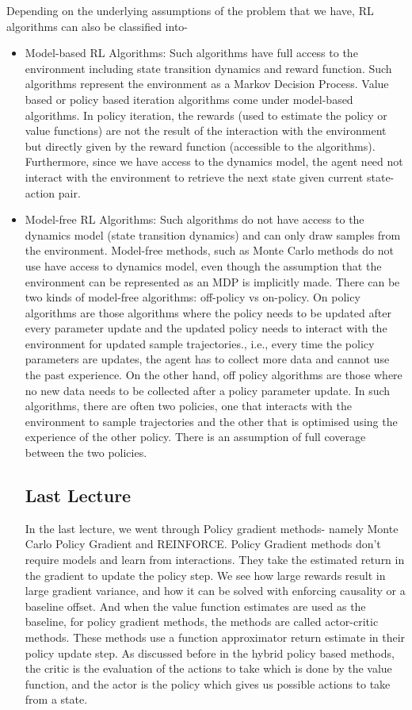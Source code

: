 \documentclass[11pt]{article}
\begin{document}
Depending on the underlying assumptions of the problem that we have, RL algorithms can also be classified into- 
\begin{itemize}
    \item Model-based RL Algorithms: Such algorithms have full access to the environment including state transition dynamics and reward function.  Such algorithms represent the environment as a Markov Decision Process. Value based or policy based iteration algorithms come under model-based algorithms. In policy iteration, the rewards (used to estimate the policy or value functions) are not the result of the interaction with the environment but directly given by the reward function (accessible to the algorithms). Furthermore, since we have access to the dynamics model, the agent need not interact with the environment to retrieve the next state given current state-action pair.
    
    \item Model-free RL Algorithms: Such algorithms do not have access to the dynamics model (state transition dynamics) and can only draw samples from the environment. Model-free methods, such as Monte Carlo methods do not use have access to dynamics model, even though the assumption that the environment can be represented as an MDP is implicitly made. There can be two kinds of model-free algorithms: off-policy vs on-policy. On policy algorithms are those algorithms where the policy needs to be updated after every parameter update and the updated policy needs to interact with the environment for updated sample trajectories., i.e., every time the policy parameters are updates, the agent has to collect more data and cannot use the past experience. On the other hand, off policy algorithms are those where no new data needs to be collected after a policy parameter update. In such algorithms, there are often two policies, one that interacts with the environment to sample trajectories and the other that is optimised using the experience of the other policy. There is an assumption of full coverage between the two policies. 
    
\subsection{Last Lecture}
In the last lecture, we went through Policy gradient methods- namely Monte Carlo Policy Gradient and REINFORCE. Policy Gradient methods don't require models and learn from interactions. They take the estimated return in the gradient to update the policy step. We see how large rewards result in large gradient variance, and how it can be solved with enforcing causality or a baseline offset. And when the value function estimates are used as the baseline, for policy gradient methods, the methods are called actor-critic methods. These methods use a function approximator return estimate in their policy update step. As discussed before in the hybrid policy based methods, the critic is the evaluation of the actions to take which is done by the value function, and the actor is the policy which gives us possible actions to take from a state.








\end{itemize}
\end{document}
